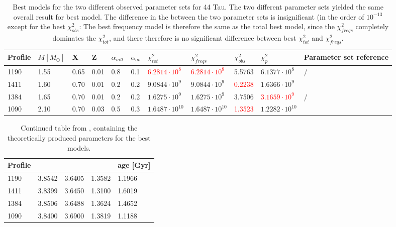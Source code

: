\begin{table}
	\caption{Best models for the two different observed parameter sets for 44 Tau. The two different parameter sets yielded the same overall result for best model. The difference in the \chis between the two parameter sets is insignificant (in the order of $10^{-13}$ except for the best $\chi_{obs}^2$: The best frequency model is therefore the same as the total best model, since the $\chi_{freqs}^2$ completely dominates the $\chi_{tot}^2$, and there therefore is no significant difference between best $\chi_{tot}^2$ and $\chi_{freqs}^2$. }
	\label{bestmodels}
	
	\begin{tabular}{lllllllllll}
		\toprule
		Profile & $M[M_\odot]$  & X & Z & $\alpha_{mlt}$ & $\alpha_{ov}$ & $\chi_{tot}^2$ &$\chi_{freqs}^2$ & $\chi_{obs}^2$ & $\chi_{p}^2$ & Parameter set reference\\
		\midrule
		1190 &1.55 & 0.65  & 0.01  & 0.8  & 0.1  & \textcolor{red}{$6.2814 \cdot 10^{8}$} &  \textcolor{red}{$6.2814 \cdot 10^{8}$} & 5.5763 & $6.1377 \cdot 10^{8}$ &  \citet{lenz2010delta}/\citet{brown2018gaia}\\
		1411 & 1.60 & 0.70  & 0.01  & 0.2  & 0.2 &  $9.0844\cdot 10^{9}$ & $9.0844\cdot 10^{9}$ & \textcolor{red}{0.2238} & $1.6366 \cdot 10^{9}$ &  \citet{lenz2010delta}  \\
		1384 & 1.65 & 0.70 & 0.01 & 0.2  & 0.2  & $1.6275\cdot10^{9}$    & $1.6275 \cdot 10^{9} $ & 3.7506  & \textcolor{red}{$3.1659 \cdot 10^{9} $} & \citet{lenz2010delta}/\citet{brown2018gaia}\\
		1090 & 2.10 & 0.70 & 0.03 & 0.5  & 0.3  &  $1.6487\cdot10^{10}$    & $1.6487 \cdot 10^{10} $ & \textcolor{red}{1.3523}  & $1.2282 \cdot 10^{10} $ & \citet{brown2018gaia}\\
	\bottomrule
	\end{tabular}
\end{table}

\begin{table}
	\centering
	\caption{Continued table from , containing the theoretically produced parameters for the best models. }
	\label{bestmodels_continued}
	
	\begin{tabular}{lllll}
		\toprule
		Profile &  \teff & \logg & \lum & age [Gyr] \\
		\midrule
		1190 &3.8542 & 3.6405  & 1.3582  & 1.1966\\
		1411 & 3.8399 & 3.6450  & 1.3100  & 1.6019\\
		1384 & 3.8506 & 3.6488 & 1.3624 &  1.4652\\
		1090 & 3.8400& 3.6900 & 1.3819 &  1.1188\\
		\bottomrule
	\end{tabular}
\end{table}

